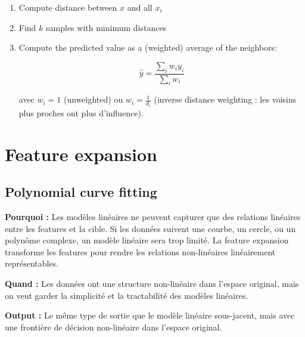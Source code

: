\documentclass[11pt,a4paper,openany]{book}
\begin{document}
\begin{algbox}[title=KNN regression algorithm]
\begin{enumerate}
    \item Compute distance between $x$ and all $x_i$

    \item Find $k$ samples with minimum distances

    \item Compute the predicted value as a (weighted) average of the neighbors:

    \[
    \hat{y}
    =
    \frac{
    \sum_i w_i y_i
    }{
    \sum_i w_i
    }
    \]

    avec $w_i = 1$ (unweighted) ou $w_i = \frac{1}{d_i}$ (inverse distance weighting : les voisins plus proches ont plus d'influence).

\end{enumerate}
\end{algbox}

\newpage \section{Feature expansion}
\vspace{8cm}

\subsection{Polynomial curve fitting}

\begin{rembox}[title=Pourquoi et quand utiliser la feature expansion ?]
\textbf{Pourquoi :} Les modèles linéaires ne peuvent capturer que des relations linéaires entre les features et la cible. Si les données suivent une courbe, un cercle, ou un polynôme complexe, un modèle linéaire sera trop limité. La feature expansion transforme les features pour rendre les relations non-linéaires linéairement représentables.

\vspace{0.3cm}

\textbf{Quand :} Les données ont une structure non-linéaire dans l'espace original, mais on veut garder la simplicité et la tractabilité des modèles linéaires.

\vspace{0.3cm}

\textbf{Output :} Le même type de sortie que le modèle linéaire sous-jacent, mais avec une frontière de décision non-linéaire dans l'espace original.
\end{rembox}
\end{document}
